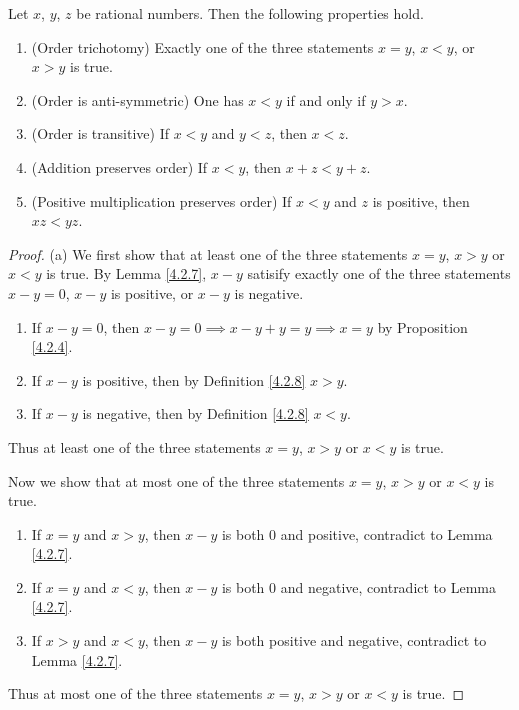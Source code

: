 \begin{proposition}\label{4.2.9}
    Let \(x\), \(y\), \(z\) be rational numbers.
    Then the following properties hold.
    \begin{enumerate}
        \item (Order trichotomy)
              Exactly one of the three statements \(x = y\), \(x < y\), or \(x > y\) is true.
        \item (Order is anti-symmetric)
              One has \(x < y\) if and only if \(y > x\).
        \item (Order is transitive)
              If \(x < y\) and \(y < z\), then \(x < z\).
        \item (Addition preserves order)
              If \(x < y\), then \(x + z < y + z\).
        \item (Positive multiplication preserves order)
              If \(x < y\) and \(z\) is positive, then \(xz < yz\).
    \end{enumerate}
\end{proposition}

\begin{proof}{(a)}
    We first show that at least one of the three statements \(x = y\), \(x > y\) or \(x < y\) is true.
    By Lemma \ref{4.2.7}, \(x - y\) satisify exactly one of the three statements \(x - y = 0\), \(x - y\) is positive, or \(x - y\) is negative.
    \begin{enumerate}[label=(\roman*)]
        \item If \(x - y = 0\), then \(x - y = 0 \implies x - y + y = y \implies x = y\) by Proposition \ref{4.2.4}.
        \item If \(x - y\) is positive, then by Definition \ref{4.2.8} \(x > y\).
        \item If \(x - y\) is negative, then by Definition \ref{4.2.8} \(x < y\).
    \end{enumerate}
    Thus at least one of the three statements \(x = y\), \(x > y\) or \(x < y\) is true.

    Now we show that at most one of the three statements \(x = y\), \(x > y\) or \(x < y\) is true.
    \begin{enumerate}[label=(\roman*)]
        \item If \(x = y\) and \(x > y\), then \(x - y\) is both \(0\) and positive, contradict to Lemma \ref{4.2.7}.
        \item If \(x = y\) and \(x < y\), then \(x - y\) is both \(0\) and negative, contradict to Lemma \ref{4.2.7}.
        \item If \(x > y\) and \(x < y\), then \(x - y\) is both positive and negative, contradict to Lemma \ref{4.2.7}.
    \end{enumerate}
    Thus at most one of the three statements \(x = y\), \(x > y\) or \(x < y\) is true.
\end{proof}

